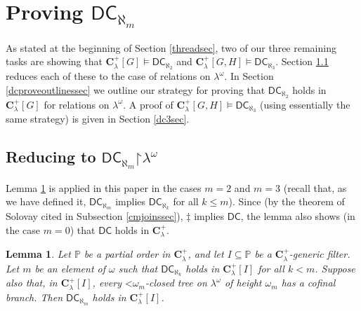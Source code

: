 \documentclass[12pt]{article}
\newtheorem{lemma}[theorem]{Lemma}
\def\c{{\mathbf{C}}}
\def\bbC{{\mathbf{C}}}
\newcommand{\bbP}{\mathbb{P}}
\renewcommand{\models}{\vDash}
\newcommand{\DC}{\mathsf{DC}}
\newcommand{\less}{\mathord{<}}
\newcommand{\restrict}{\mathord{\upharpoonright}}
\begin{document}
\section{Proving $\DC_{\aleph_{m}}$}

As stated at the beginning of Section \ref{threadsec}, two of our three remaining tasks are showing that $\c^{+}_{\lambda}[G] \models \DC_{\aleph_{2}}$ and $\c^{+}_{\lambda}[G,H] \models \DC_{\aleph_{3}}$. Section \ref{dcreducesec} reduces each of these to the case of relations on $\lambda^{\omega}$. In Section \ref{dcproveoutlinessec} we outline our strategy for proving that $\DC_{\aleph_{2}}$ holds in $\bbC^{+}_{\lambda}[G]$ for relations on $\lambda^{\omega}$. A proof of $\c^{+}_{\lambda}[G,H] \models \DC_{\aleph_{3}}$ (using essentially the same strategy) is given in Section \ref{dc3sec}.

\subsection{Reducing to $\DC_{\aleph_{m}}\restrict \lambda^{\omega}$}\label{dcreducesec}

Lemma \ref{dcreducelem} is applied in this paper in the cases $m=2$ and $m=3$ (recall that, as we have defined it, $\DC_{\aleph_{m}}$ implies $\DC_{\aleph_{k}}$ for all $k \leq m$). Since (by the theorem of Solovay cited in Subsection \ref{cmjoinssec}), $\ddagger$ implies $\DC$, the lemma also shows (in the case $m=0$) that $\DC$ holds in $\bbC^{+}_{\lambda}$.


\begin{lemma}\label{dcreducelem} Let $\bbP$ be a partial order in $\bbC^{+}_{\lambda}$, and let $I \subseteq \bbP$ be a $\bbC^{+}_{\lambda}$-generic filter. Let $m$ be an element of $\omega$ such that $\DC_{\aleph_{k}}$ holds in $\bbC^{+}_{\lambda}[I]$ for all $k < m$.
Suppose also that, in $\bbC^{+}_{\lambda}[I]$,  every $\less\omega_{m}$-closed tree  on $\lambda^{\omega}$ of height $\omega_{m}$ has a cofinal branch.
Then $\DC_{\aleph_{m}}$ holds in $\bbC^{+}_{\lambda}[I]$.
\end{lemma}
\end{document}
